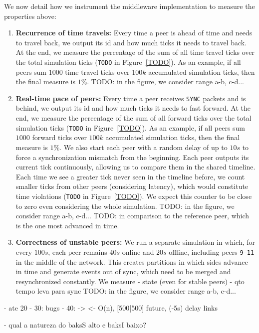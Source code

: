 \documentclass[10pt,journal,compsoc]{IEEEtran}
\newcommand{\code}[1]  {\texttt{\footnotesize{#1}}}
\begin{document}
We now detail how we instrument the middleware implementation to measure the
properties above:
%
\begin{enumerate}
%
\item \textbf{Recurrence of time travels:}
Every time a peer is ahead of time and needs to travel back, we output its id
and how much ticks it needs to travel back.
At the end, we measure the percentage of the sum of all time travel ticks over
the total simulation ticks (\code{TODO} in Figure~\ref{TODO}).
As an example, if all peers sum $1000$ time travel ticks over $100k$
accumulated simulation ticks, then the final measure is $1\%$.
TODO: in the figure, we consider range a-b, c-d...
%
\item \textbf{Real-time pace of peers:}
Every time a peer receives \code{SYNC} packets and is behind, we output its id
and how much ticks it needs to fast forward.
At the end, we measure the percentage of the sum of all forward ticks over the
total simulation ticks (\code{TODO} in Figure~\ref{TODO}).
As an example, if all peers sum $1000$ forward ticks over $100k$ accumulated
simulation ticks, then the final measure is $1\%$.
%
We also start each peer with a random delay of up to $10s$ to force a
synchronization mismatch from the beginning.
%
Each peer outputs its current tick continuously, allowing us to compare them
in the shared timeline.
Each time we see a greater tick never seen in the timeline before, we count
smaller ticks from other peers (considering latency), which would constitute
time violations (\code{TODO} in Figure~\ref{TODO}).
We expect this counter to be close to zero even considering the whole
simulation.
TODO: in the figure, we consider range a-b, c-d...
TODO: in comparison to the reference peer, which is the one most advanced in time.
%
\item \textbf{Correctness of unstable peers:}
We run a separate simulation in which, for every $100s$, each peer remains
$40s$ online and $20s$ offline, including peers \code{9--11} in the middle of
the network.
This creates partitions in which sides advance in time and generate events out
of sync, which need to be merged and resynchronized constantly.
We measure
    - state (even for stable peers)
    - qto tempo leva para sync
TODO: in the figure, we consider range a-b, c-d...
%
\end{enumerate}

- ate 20
- 30: bugs
- 40: -> <- O(n), [500|500] future, (-5s) delay links

- qual a natureza do baksS alto e baksI baixo?
\end{document}
